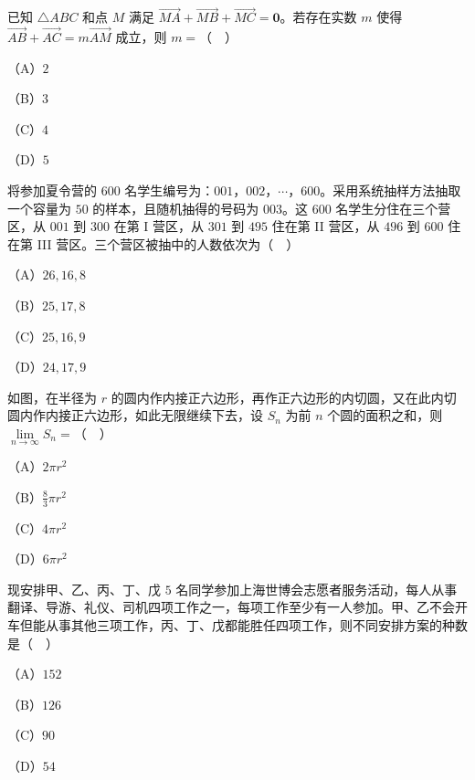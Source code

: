 \begin{question}
已知 $\triangle ABC$ 和点 $M$ 满足 $\overrightarrow{MA}+\overrightarrow{MB}+\overrightarrow{MC}=\boldsymbol 0$。若存在实数 $m$ 使得 $\overrightarrow{AB}+\overrightarrow{AC}=m\overrightarrow{AM}$ 成立，则 $m=$（　）

（A）$2$

（B）$3$

（C）$4$

（D）$5$

\end{question}
\begin{question}
将参加夏令营的 $600$ 名学生编号为：$001$，$002$，$\cdots$，$600$。采用系统抽样方法抽取一个容量为 $50$ 的样本，且随机抽得的号码为 $003$。这 $600$ 名学生分住在三个营区，从 $001$ 到 $300$ 在第 I 营区，从 $301$ 到 $495$ 住在第 II 营区，从 $496$ 到 $600$ 住在第 III 营区。三个营区被抽中的人数依次为（　）

（A）$26,16,8$

（B）$25,17,8$

（C）$25,16,9$

（D）$24,17,9$

\Needspace{0.4\textheight}
\end{question}
\begingroup
\renewenvironment{question}{\Needspace{0.5\textheight}}{}
\begin{question}
如图，在半径为 $r$ 的圆内作内接正六边形，再作正六边形的内切圆，又在此内切圆内作内接正六边形，如此无限继续下去，设 $S_n$ 为前 $n$ 个圆的面积之和，则 $\lim\limits_{n\to\infty}S_n=$（　）

（A）$2\pi r^2$

（B）$\frac83\pi r^2$

（C）$4\pi r^2$

（D）$6\pi r^2$
\nopagebreak[4]
\begin{center}\end{center}
\nopagebreak[4]
\end{question}
\endgroup
\begin{question}
现安排甲、乙、丙、丁、戊 $5$ 名同学参加上海世博会志愿者服务活动，每人从事翻译、导游、礼仪、司机四项工作之一，每项工作至少有一人参加。甲、乙不会开车但能从事其他三项工作，丙、丁、戊都能胜任四项工作，则不同安排方案的种数是（　）

（A）$152$

（B）$126$

（C）$90$

（D）$54$

\end{question}
